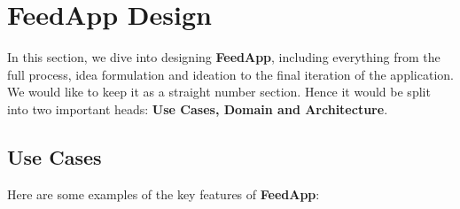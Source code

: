 \section{FeedApp Design}
\label{feedapp_design}

In this section, we dive into designing \textbf{FeedApp}, including everything from the full process, idea formulation and ideation to the final iteration of the application. We would like to keep it as a straight number section. Hence it would be split into two important heads: \textbf{Use Cases, Domain and Architecture}.

\subsection{Use Cases}

Here are some examples of the key features of \textbf{FeedApp}:

